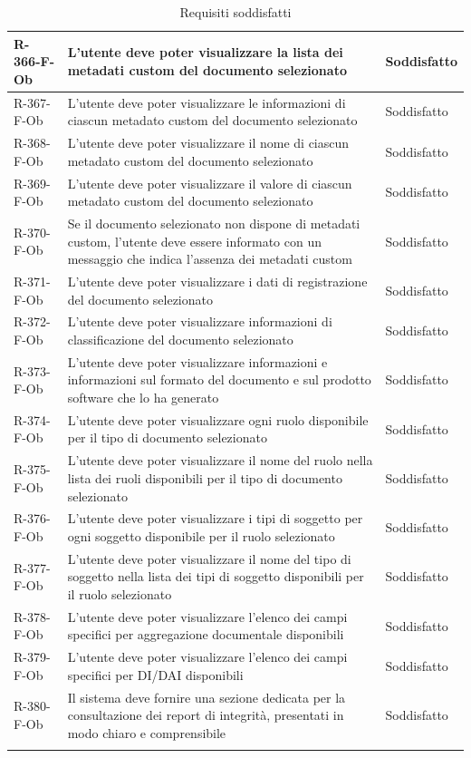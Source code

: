 \begin{longtable}{|p{2.5cm}|p{9.5cm}|p{2.5cm}|}
\hline
R-366-F-Ob & L'utente deve poter visualizzare la lista dei metadati custom del documento selezionato & Soddisfatto \\
\hline
R-367-F-Ob & L'utente deve poter visualizzare le informazioni di ciascun metadato custom del documento selezionato & Soddisfatto \\
\hline
R-368-F-Ob & L'utente deve poter visualizzare il nome di ciascun metadato custom del documento selezionato & Soddisfatto \\
\hline
R-369-F-Ob & L'utente deve poter visualizzare il valore di ciascun metadato custom del documento selezionato & Soddisfatto \\
\hline
R-370-F-Ob & Se il documento selezionato non dispone di metadati custom, l'utente deve essere informato con un messaggio che indica l'assenza dei metadati custom & Soddisfatto \\
\hline
R-371-F-Ob & L'utente deve poter visualizzare i dati di registrazione del documento selezionato & Soddisfatto \\
\hline
R-372-F-Ob & L'utente deve poter visualizzare informazioni di classificazione del documento selezionato & Soddisfatto \\
\hline
R-373-F-Ob & L'utente deve poter visualizzare informazioni e informazioni sul formato del documento e sul prodotto software che lo ha generato & Soddisfatto \\
\hline
R-374-F-Ob & L'utente deve poter visualizzare ogni ruolo disponibile per il tipo di documento selezionato & Soddisfatto \\
\hline
R-375-F-Ob & L'utente deve poter visualizzare il nome del ruolo nella lista dei ruoli disponibili per il tipo di documento selezionato & Soddisfatto \\
\hline
R-376-F-Ob & L'utente deve poter visualizzare i tipi di soggetto per ogni soggetto disponibile per il ruolo selezionato & Soddisfatto \\
\hline
R-377-F-Ob & L'utente deve poter visualizzare il nome del tipo di soggetto nella lista dei tipi di soggetto disponibili per il ruolo selezionato & Soddisfatto \\
\hline
R-378-F-Ob & L'utente deve poter visualizzare l'elenco dei campi specifici per aggregazione documentale disponibili & Soddisfatto \\
\hline
R-379-F-Ob & L'utente deve poter visualizzare l'elenco dei campi specifici per DI/DAI disponibili & Soddisfatto \\
\hline
R-380-F-Ob & Il sistema deve fornire una sezione dedicata per la consultazione dei report di integrità, presentati in modo chiaro e comprensibile & Soddisfatto \\
\hline
\rowcolor{white}
\caption{Requisiti soddisfatti}
\label{tab:req-funzionali}
\end{longtable}

